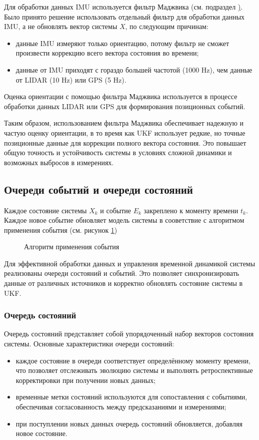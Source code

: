 Для обработки данных IMU используется фильтр Маджвика (см. подраздел \href{sec:ahrs}). Было принято решение использовать
отдельный фильтр для обработки данных IMU, а не обновлять вектор системы ${X}$,
по следующим причинам:
\begin{itemize}
	\item данные IMU измеряют только ориентацию, потому фильтр не сможет произвести коррекцию
	      всего вектора состояния во времени;
        \item данные от IMU приходят с гораздо большей частотой (1000 Hz), чем данные от LIDAR (10 Hz) или GPS (5 Hz).
\end{itemize}

Оценка ориентации с помощью фильтра Маджвика используется 
в процессе обработки данных LIDAR или GPS для формирования позиционных событий.

Таким образом, использованием фильтра Маджвика обеспечивает надежную и частую оценку ориентации, в то время как UKF использует редкие, но точные позиционные данные для коррекции полного вектора состояния.
Это повышает общую точность и устойчивость системы в условиях сложной динамики и возможных выбросов в измерениях.

\subsection{Очереди событий и очереди состояний}
\label{subsec:queues}

Каждое состояние системы ${X}_k$ и событие ${E}_k$ 
закреплено к моменту времени $t_k$. Каждое новое событие 
обновляет модель системы в сооветствие с алгоритмом применения события (см. рисунок \ref{fig:apply_kf_event})
\FloatBarrier
\begin{figure}[H]
\centering
\caption{Алгоритм применения события}
\label{fig:apply_kf_event}
\end{figure}

Для эффективной обработки данных и управления временной динамикой системы реализованы очереди состояний и событий.
Это позволяет синхронизировать данные от различных источников и корректно обновлять состояние системы в UKF.

\subsubsection{Очередь состояний}
\label{subsec:state_queue}

Очередь состояний представляет собой упорядоченный набор векторов состояния системы.
Основные характеристики очереди состояний:
\begin{itemize}
    \item каждое состояние в очереди соответствует определённому моменту времени, что позволяет отслеживать эволюцию системы и выполнять ретроспективные корректировки при получении новых данных;
    \item временные метки состояний используются для сопоставления с событиями, обеспечивая согласованность между предсказаниями и измерениями;
    \item при поступлении новых данных очередь состояний обновляется, добавляя новое состояние.
\end{itemize}

